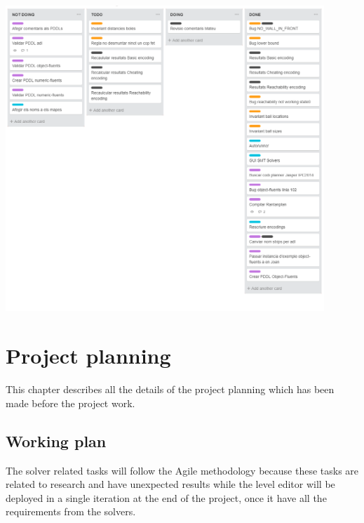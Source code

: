 \documentclass{report}
\theoremstyle{plain}
\begin{document}
\begin{center}
\includegraphics[width=0.9\textwidth, trim={0 16.3cm 0 0},clip]{trello.png}
\end{center}




\chapter{Project planning}
This chapter describes all the details of the project planning which has been made before the project work.

\section{Working plan}
The solver related tasks will follow the Agile methodology because these tasks are related to research and have unexpected results while the level editor will be deployed in a single iteration at the end of the project, once it have all the requirements from the solvers.
\end{document}

